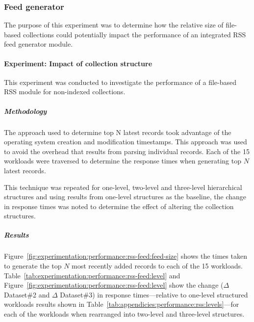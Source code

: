 \subsubsection[Feed generator]{Feed generator}
\label{sec:evaluation:performance:rss-feed}

The purpose of this experiment was to determine how the relative size
of file-based collections could potentially impact the performance of an
integrated RSS feed generator module.

\paragraph{Experiment: Impact of collection structure}
\label{sec:evaluation:performance:rss-feed:experiment1}

This experiment was conducted to investigate the performance of a file-based RSS module for non-indexed collections.

\subparagraph{Methodology}

The approach used to determine top N latest records took advantage of the operating system creation and modification timestamps. This approach was used to avoid the overhead that results from parsing individual records. Each of the \num{15} workloads were traversed to determine the response times when generating top $N$ latest records.

This technique was repeated for one-level, two-level and three-level hierarchical structures and using results from one-level structures as the baseline, the change in response times was noted to determine the effect of altering the collection structures.

\subparagraph{Results}

Figure~\ref{fig:experimentation:performance:rss-feed:feed-size} shows the times taken to generate the top $N$ most recently added records to each of the \num{15} workloads. Table~\ref{tab:experimentation:performance:rss-feed:level} and Figure~\ref{fig:experimentation:performance:rss-feed:level} show the change ($\Delta$ Dataset\#2 and $\Delta$ Dataset\#3) in response times---relative to one-level structured workloads results shown in Table~\ref{tab:appendicies:performance:rss:levels}---for each of the workloads when rearranged into two-level and three-level structures.

% 
\begin{comment}
\tablespacing

\bodyspacing
\end{comment}

